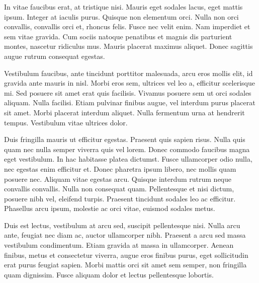 In vitae faucibus erat, at tristique nisi. Mauris eget sodales lacus, eget mattis ipsum. Integer at iaculis purus. Quisque non elementum orci. Nulla non orci convallis, convallis orci et, rhoncus felis. Fusce nec velit enim. Nam imperdiet et sem vitae gravida. Cum sociis natoque penatibus et magnis dis parturient montes, nascetur ridiculus mus. Mauris placerat maximus aliquet. Donec sagittis augue rutrum consequat egestas.

Vestibulum faucibus, ante tincidunt porttitor malesuada, arcu eros mollis elit, id gravida ante mauris in nisl. Morbi eros sem, ultrices vel leo a, efficitur scelerisque mi. Sed posuere sit amet erat quis facilisis. Vivamus posuere sem ut orci sodales aliquam. Nulla facilisi. Etiam pulvinar finibus augue, vel interdum purus placerat sit amet. Morbi placerat interdum aliquet. Nulla fermentum urna at hendrerit tempus. Vestibulum vitae ultrices dolor.

Duis fringilla mauris ut efficitur egestas. Praesent quis sapien risus. Nulla quis quam nec nulla semper viverra quis vel lorem. Donec commodo faucibus magna eget vestibulum. In hac habitasse platea dictumst. Fusce ullamcorper odio nulla, nec egestas enim efficitur et. Donec pharetra ipsum libero, nec mollis quam posuere nec. Aliquam vitae egestas arcu. Quisque interdum rutrum neque convallis convallis. Nulla non consequat quam. Pellentesque et nisi dictum, posuere nibh vel, eleifend turpis. Praesent tincidunt sodales leo ac efficitur. Phasellus arcu ipsum, molestie ac orci vitae, euismod sodales metus.

Duis est lectus, vestibulum at arcu sed, suscipit pellentesque nisi. Nulla arcu ante, feugiat nec diam ac, auctor ullamcorper nibh. Praesent a arcu sed massa vestibulum condimentum. Etiam gravida at massa in ullamcorper. Aenean finibus, metus et consectetur viverra, augue eros finibus purus, eget sollicitudin erat purus feugiat sapien. Morbi mattis orci sit amet sem semper, non fringilla quam dignissim. Fusce aliquam dolor et lectus pellentesque lobortis. 






























